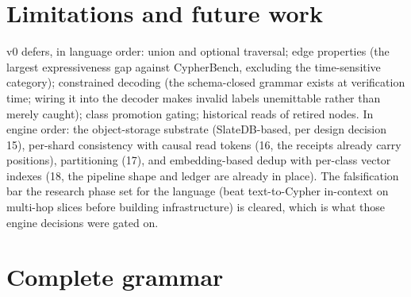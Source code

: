 \documentclass[11pt]{article}
\begin{document}
\section{Limitations and future work}

v0 defers, in language order: union and optional traversal; edge properties (the largest expressiveness gap against CypherBench, excluding the time-sensitive category); constrained decoding (the schema-closed grammar exists at verification time; wiring it into the decoder makes invalid labels unemittable rather than merely caught); class promotion gating; historical reads of retired nodes. In engine order: the object-storage substrate (SlateDB-based, per design decision 15), per-shard consistency with causal read tokens (16, the receipts already carry positions), partitioning (17), and embedding-based dedup with per-class vector indexes (18, the pipeline shape and ledger are already in place). The falsification bar the research phase set for the language (beat text-to-Cypher in-context on multi-hop slices before building infrastructure) is cleared, which is what those engine decisions were gated on.

\appendix
\section{Complete grammar}
\end{document}
